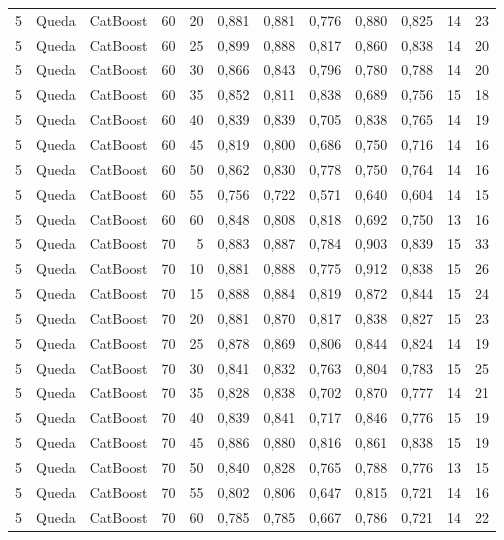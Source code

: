 \begin{longtable}{ccclrrrrrrrr}
5 & Queda & CatBoost & 60 & 20 & 0,881 & 0,881 & 0,776 & 0,880 & 0,825 & 14 & 23 \\
5 & Queda & CatBoost & 60 & 25 & 0,899 & 0,888 & 0,817 & 0,860 & 0,838 & 14 & 20 \\
5 & Queda & CatBoost & 60 & 30 & 0,866 & 0,843 & 0,796 & 0,780 & 0,788 & 14 & 20 \\
5 & Queda & CatBoost & 60 & 35 & 0,852 & 0,811 & 0,838 & 0,689 & 0,756 & 15 & 18 \\
5 & Queda & CatBoost & 60 & 40 & 0,839 & 0,839 & 0,705 & 0,838 & 0,765 & 14 & 19 \\
5 & Queda & CatBoost & 60 & 45 & 0,819 & 0,800 & 0,686 & 0,750 & 0,716 & 14 & 16 \\
5 & Queda & CatBoost & 60 & 50 & 0,862 & 0,830 & 0,778 & 0,750 & 0,764 & 14 & 16 \\
5 & Queda & CatBoost & 60 & 55 & 0,756 & 0,722 & 0,571 & 0,640 & 0,604 & 14 & 15 \\
5 & Queda & CatBoost & 60 & 60 & 0,848 & 0,808 & 0,818 & 0,692 & 0,750 & 13 & 16 \\
5 & Queda & CatBoost & 70 & 5 & 0,883 & 0,887 & 0,784 & 0,903 & 0,839 & 15 & 33 \\
5 & Queda & CatBoost & 70 & 10 & 0,881 & 0,888 & 0,775 & 0,912 & 0,838 & 15 & 26 \\
5 & Queda & CatBoost & 70 & 15 & 0,888 & 0,884 & 0,819 & 0,872 & 0,844 & 15 & 24 \\
5 & Queda & CatBoost & 70 & 20 & 0,881 & 0,870 & 0,817 & 0,838 & 0,827 & 15 & 23 \\
5 & Queda & CatBoost & 70 & 25 & 0,878 & 0,869 & 0,806 & 0,844 & 0,824 & 14 & 19 \\
5 & Queda & CatBoost & 70 & 30 & 0,841 & 0,832 & 0,763 & 0,804 & 0,783 & 15 & 25 \\
5 & Queda & CatBoost & 70 & 35 & 0,828 & 0,838 & 0,702 & 0,870 & 0,777 & 14 & 21 \\
5 & Queda & CatBoost & 70 & 40 & 0,839 & 0,841 & 0,717 & 0,846 & 0,776 & 15 & 19 \\
5 & Queda & CatBoost & 70 & 45 & 0,886 & 0,880 & 0,816 & 0,861 & 0,838 & 15 & 19 \\
5 & Queda & CatBoost & 70 & 50 & 0,840 & 0,828 & 0,765 & 0,788 & 0,776 & 13 & 15 \\
5 & Queda & CatBoost & 70 & 55 & 0,802 & 0,806 & 0,647 & 0,815 & 0,721 & 14 & 16 \\
5 & Queda & CatBoost & 70 & 60 & 0,785 & 0,785 & 0,667 & 0,786 & 0,721 & 14 & 22 \\

\end{longtable}
